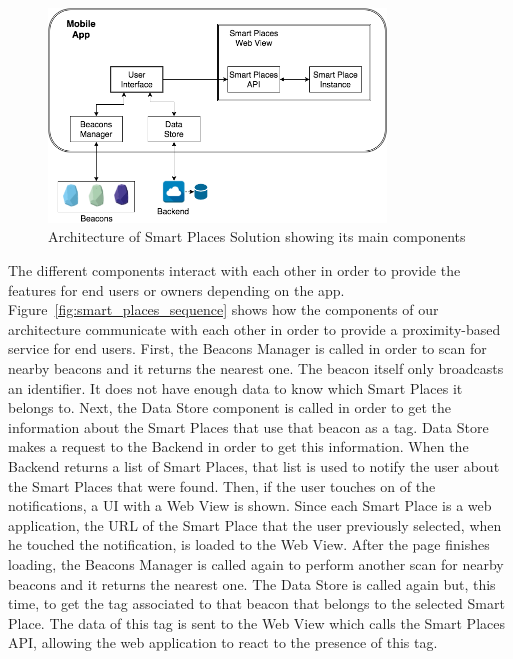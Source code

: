 \begin{figure}[!ht]
  \centering
    \includegraphics[width=0.8\textwidth, keepaspectratio]{images/smart_places_architecture}
    \caption[Smart Places Solution Architecture]{Architecture of Smart Places Solution showing its main components}
    \label{fig:smart_places_architecture}
\end{figure}

The different components interact with each other in order to provide the features for end users or owners depending on the app.
Figure~\ref{fig:smart_places_sequence} shows how the components of our architecture communicate with each other in order to provide a proximity-based service for end users.
First, the Beacons Manager is called in order to scan for nearby beacons and it returns the nearest one.
The beacon itself only broadcasts an identifier.
It does not have enough data to know which Smart Places it belongs to.
Next, the Data Store component is called in order to get the information about the Smart Places that use that beacon as a tag.
Data Store makes a request to the Backend in order to get this information.
When the Backend returns a list of Smart Places, that list is used to notify the user about the Smart Places that were found.
Then, if the user touches on of the notifications, a \gls{UI} with a Web View is shown.
Since each Smart Place is a web application, the \gls{URL} of the Smart Place that the user previously selected, when he touched the notification, is loaded to the Web View.
After the page finishes loading, the Beacons Manager is called again to perform another scan for nearby beacons and it returns the nearest one.
The Data Store is called again but, this time, to get the tag associated to that beacon that belongs to the selected Smart Place.
The data of this tag is sent to the Web View which calls the Smart Places \gls{API}, allowing the web application to react to the presence of this tag.

